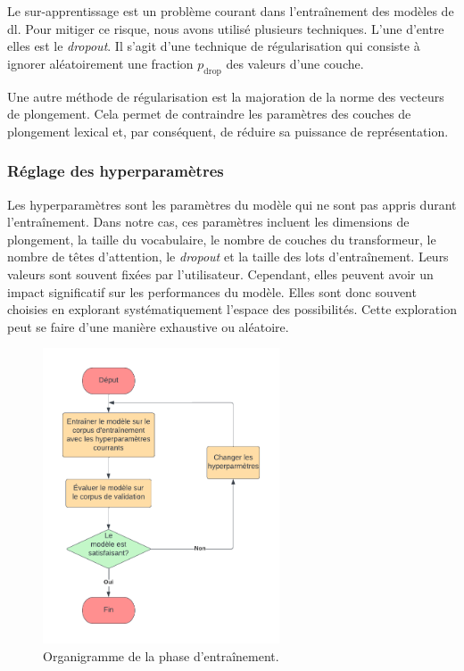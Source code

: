 Le sur-apprentissage est un problème courant dans l'entraînement des modèles de \gls{dl}.
Pour mitiger ce risque, nous avons utilisé plusieurs techniques.
L'une d'entre elles est le \emph{\foreignlanguage{english}{dropout}}.
Il s'agit d'une technique de régularisation 
qui consiste à ignorer aléatoirement une fraction \(p_{\mathrm{drop}}\) des valeurs d'une couche.

Une autre méthode de régularisation est la majoration de la norme des vecteurs de plongement.
Cela permet de contraindre les paramètres des couches de plongement lexical
et, par conséquent, de réduire sa puissance de représentation.



\subsubsection{Réglage des hyperparamètres}

Les hyperparamètres sont les paramètres du modèle qui ne sont pas appris durant l'entraînement.
Dans notre cas, ces paramètres incluent les dimensions de plongement, 
la taille du vocabulaire, le nombre de couches du transformeur, 
le nombre de têtes d'attention, 
le \emph{\foreignlanguage{english}{dropout}} et la taille des lots d'entraînement.
Leurs valeurs sont souvent fixées par l'utilisateur.
Cependant, elles peuvent avoir un impact significatif sur les performances du modèle.
Elles sont donc souvent choisies en explorant systématiquement l'espace des possibilités.
Cette exploration peut se faire d'une manière exhaustive ou aléatoire.

\begin{figure}[htb]
    \begin{center}
        \includegraphics[width=7cm]{assets/pdf/Training.pdf}
    \end{center}
    \caption{Organigramme de la phase d'entraînement.}
    \label{fig.training}
\end{figure}

